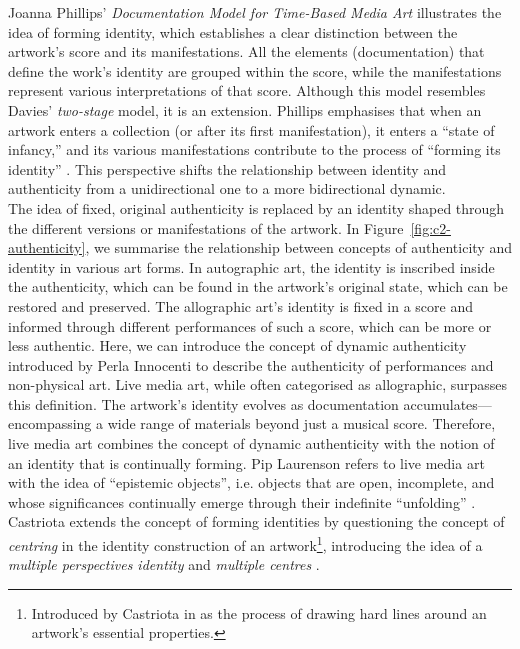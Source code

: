 Joanna Phillips’ \textit{Documentation Model for Time-Based Media Art} illustrates the idea of forming identity, which establishes a clear distinction between the artwork’s score and its manifestations. All the elements (documentation) that define the work's identity are grouped within the score, while the manifestations represent various interpretations of that score. Although this model resembles Davies’ \textit{two-stage} model, it is an extension. Phillips emphasises that when an artwork enters a collection (or after its first manifestation), it enters a ``state of infancy,'' and its various manifestations contribute to the process of ``forming its identity'' \cite{phillips2012shifting, phillips2015reporting}. This perspective shifts the relationship between identity and authenticity from a unidirectional one to a more bidirectional dynamic.\\
The idea of fixed, original authenticity is replaced by an identity shaped through the different versions or manifestations of the artwork. In Figure~\ref{fig:c2-authenticity}, we summarise the relationship between concepts of authenticity and identity in various art forms. In autographic art, the identity is inscribed inside the authenticity, which can be found in the artwork's original state, which can be restored and preserved. The allographic art’s identity is fixed in a score and informed through different performances of such a score, which can be more or less authentic. Here, we can introduce the concept of dynamic authenticity introduced by Perla Innocenti \cite{innocenti2012bridging, innocenti2012rethinking} to describe the authenticity of performances and non-physical art. Live media art, while often categorised as allographic, surpasses this definition. The artwork's identity evolves as documentation accumulates—encompassing a wide range of materials beyond just a musical score. Therefore, live media art combines the concept of dynamic authenticity with the notion of an identity that is continually forming. Pip Laurenson refers to live media art with the idea of ``epistemic objects'', i.e. objects that are open, incomplete, and whose significances continually emerge through their indefinite ``unfolding'' \cite{laurenson2016practices}. Castriota extends the concept of forming identities by questioning the concept of \textit{centring} in the identity construction of an artwork\footnote{Introduced by Castriota in \cite{castriota2018centres} as the process of drawing hard lines around an artwork’s essential properties.}, introducing the idea of a \textit{multiple perspectives identity} and \textit{multiple centres} \cite{castriota2019authenticity, castriota2024enfolding}.
